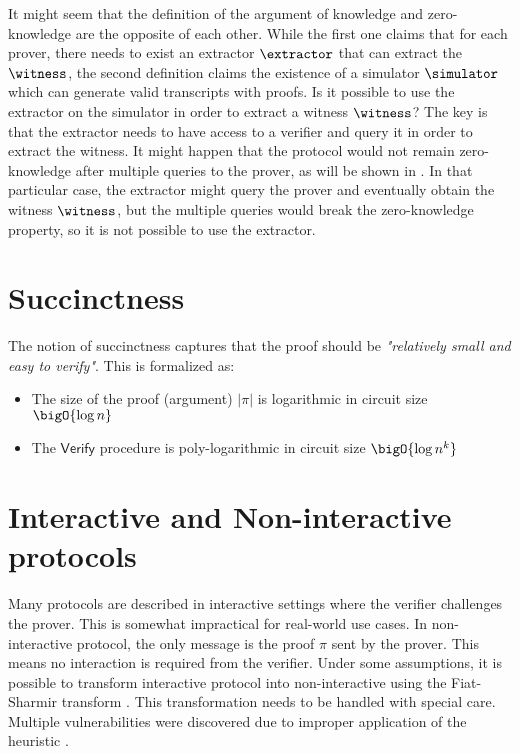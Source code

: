 It might seem that the definition of the argument of knowledge and zero-knowledge are the opposite of each other. While the first one claims that for each prover, there needs to exist an extractor $\extractor$ that can extract the $\witness$, the second definition claims the existence of a simulator $\simulator$ which can generate valid transcripts with proofs. Is it possible to use the extractor on the simulator in order to extract a witness $\witness$? The key is that the extractor needs to have access to a verifier and query it in order to extract the witness. It might happen that the protocol would not remain zero-knowledge after multiple queries to the prover, as will be shown in . In that particular case, the extractor might query the prover and eventually obtain the witness $\witness$, but the multiple queries would break the zero-knowledge property, so it is not possible to use the extractor.  

\section{Succinctness}

The notion of succinctness captures that the proof should be \textit{"relatively small and easy to verify"}. This is formalized as:
\begin{itemize}
    \item The size of the proof (argument) $|\pi|$ is logarithmic in circuit size $\bigO{\log{n}}$
    \item The $\mathsf{Verify}$ procedure is poly-logarithmic in circuit size $\bigO{\log{n}^k}$
\end{itemize}


\section{Interactive and Non-interactive protocols}
Many protocols are described in interactive settings where the verifier challenges the prover. This is somewhat impractical for real-world use cases. In non-interactive protocol, the only message is the proof $\pi$ sent by the prover. This means no interaction is required from the verifier. Under some assumptions, it is possible to transform interactive protocol into non-interactive using the Fiat-Sharmir transform \cite{fiat-shamir}. This transformation needs to be handled with special care. Multiple vulnerabilities were discovered due to improper application of the heuristic \cite{weak-FS}. 

